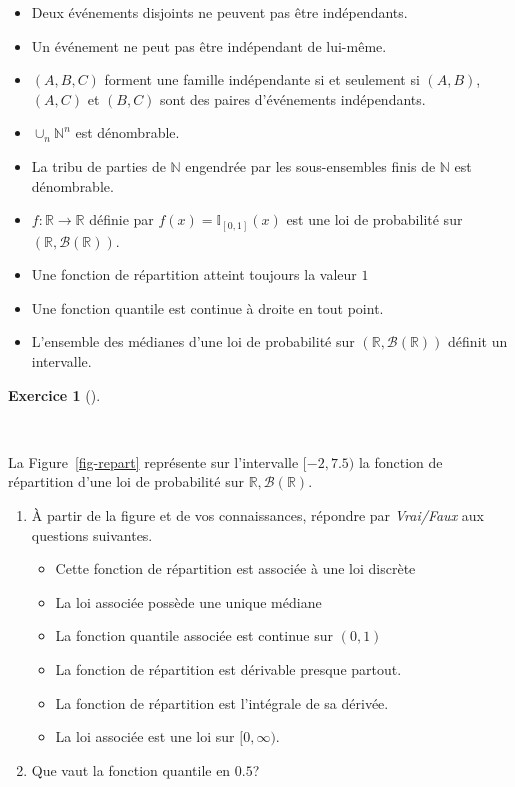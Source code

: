 \documentclass[
  french,
  11pt,
  a4paper,
  twoside,
  article,
  titlepage=false]{memoir}
\providecommand{\tightlist}{%
  \setlength{\itemsep}{0pt}\setlength{\parskip}{0pt}}
\theoremstyle{definition}
\newtheorem{exercise}{Exercice}[section]
\theoremstyle{remark}
\begin{document}
\begin{itemize}
\tightlist
\item[$\square$]
  Deux événements disjoints ne peuvent pas être indépendants.
\item[$\square$]
  Un événement ne peut pas être indépendant de lui-même.
\item[$\square$]
  \((A, B, C)\) forment une famille indépendante si et seulement si
  \((A,B)\), \((A,C)\) et \((B,C)\) sont des paires d'événements
  indépendants.
\item[$\square$]
  \(\cup_n \mathbb{N}^n\) est dénombrable.
\item[$\square$]
  La tribu de parties de \(\mathbb{N}\) engendrée par les sous-ensembles
  finis de \(\mathbb{N}\) est dénombrable.
\item[$\square$]
  \(f : \mathbb{R} \to \mathbb{R}\) définie par
  \(f(x)=\mathbb{I}_{[0,1]}(x)\) est une loi de probabilité sur
  \((\mathbb{R}, \mathcal{B}(\mathbb{R}))\).
\item[$\square$]
  Une fonction de répartition atteint toujours la valeur \(1\)
\item[$\square$]
  Une fonction quantile est continue à droite en tout point.
\item[$\square$]
  L'ensemble des médianes d'une loi de probabilité sur
  \((\mathbb{R}, \mathcal{B}(\mathbb{R}))\) définit un intervalle.
\end{itemize}

\newpage{}

\begin{exercise}[]\protect\hypertarget{exr-4-b}{}\label{exr-4-b}

~

\end{exercise}

La Figure~\ref{fig-repart} représente sur l'intervalle \([-2, 7.5)\) la
fonction de répartition d'une loi de probabilité sur
\(\mathbb{R}, \mathcal{B}(\mathbb{R})\).

\begin{enumerate}
\def\labelenumi{\roman{enumi}.}
\item
  À partir de la figure et de vos connaissances, répondre par
  \emph{Vrai/Faux} aux questions suivantes.

  \begin{itemize}
  \item[$\square$]
    Cette fonction de répartition est associée à une loi discrète
  \item[$\square$]
    La loi associée possède une unique médiane
  \item[$\square$]
    La fonction quantile associée est continue sur \((0,1)\)
  \item[$\square$]
    La fonction de répartition est dérivable presque partout.
  \item[$\square$]
    La fonction de répartition est l'intégrale de sa dérivée.
  \item[$\square$]
    La loi associée est une loi sur \([0, \infty)\).
  \end{itemize}
\item
  Que vaut la fonction quantile en \(0.5\)?
\end{enumerate}
\end{document}
